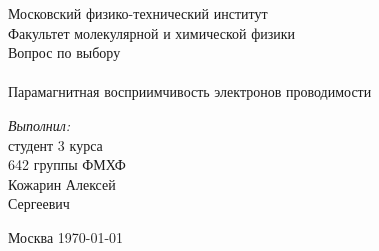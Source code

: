 \begin{titlepage}
\begin{center} 
 
\large Московский физико-технический институт\\
Факультет молекулярной и химической физики\\
\vspace{7cm}
\huge Вопрос по выбору \\\ \\ Парамагнитная восприимчивость электронов проводимости
\end{center} 

\vspace{6.5cm}
{\par \raggedleft \large \emph{Выполнил:}\\ студент 3 курса\\ 642 группы ФМХФ\\ Кожарин Алексей\\ Сергеевич \par}
\begin{center}
\vfill Москва \today
\end{center}
\end{titlepage}
\newpage
\setcounter{page}{2}
